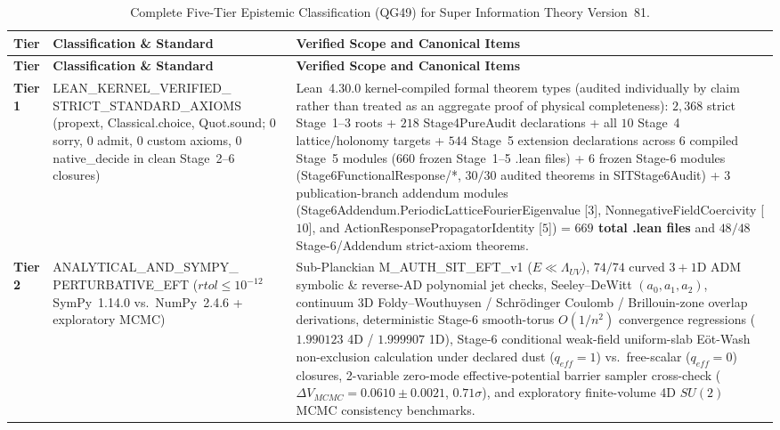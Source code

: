 \documentclass[american,11pt,letterpaper]{article}
\def\mathrm#1{#1}%
\def\texttt#1{#1}%
\begin{document}
\begin{longtable}{|p{2.3cm}|p{4.3cm}|p{8.4cm}|}
\caption{Complete Five-Tier Epistemic Classification (\texttt{QG49}) for Super Information Theory Version~81.}\label{tab:qg49-ledger}\\
\hline
\textbf{Tier} & \textbf{Classification \& Standard} & \textbf{Verified Scope and Canonical Items} \\
\hline
\endfirsthead
\hline
\textbf{Tier} & \textbf{Classification \& Standard} & \textbf{Verified Scope and Canonical Items} \\
\hline
\endhead
\hline
\endfoot
\textbf{Tier 1} & \texttt{LEAN\_\allowbreak{}KERNEL\_\allowbreak{}VERIFIED\_\allowbreak{}} \texttt{STRICT\_\allowbreak{}STANDARD\_\allowbreak{}AXIOMS} (\texttt{propext}, \texttt{Classical.choice}, \texttt{Quot.sound}; \texttt{0 sorry}, \texttt{0 admit}, \texttt{0} custom axioms, \texttt{0 native\_decide} in clean Stage~2--6 closures) & Lean~4.30.0 kernel-compiled formal theorem types (audited individually by claim rather than treated as an aggregate proof of physical completeness): $2{,}368$ strict Stage~1--3 roots + $218$ \texttt{Stage4PureAudit} declarations + all $10$ Stage~4 lattice/holonomy targets + $544$ Stage~5 extension declarations across $6$ compiled Stage~5 modules ($660$ frozen Stage~1--5 \texttt{.lean} files) + $6$ frozen Stage-6 modules (\texttt{Stage6FunctionalResponse/*}, $30/30$ audited theorems in \texttt{SITStage6Audit}) + $3$ publication-branch addendum modules (\texttt{Stage6Addendum.\allowbreak{}PeriodicLatticeFourierEigenvalue} [$3$], \texttt{NonnegativeFieldCoercivity} [$10$], and \texttt{ActionResponsePropagatorIdentity} [$5$]) = \textbf{$669$ total \texttt{.lean} files} and $48/48$ Stage-6/Addendum strict-axiom theorems. \\
\hline
\textbf{Tier 2} & \texttt{ANALYTICAL\_\allowbreak{}AND\_\allowbreak{}SYMPY\_\allowbreak{}} \texttt{PERTURBATIVE\_EFT} ($\mathrm{rtol} \le 10^{-12}$ SymPy~1.14.0 vs.\ NumPy~2.4.6 + exploratory MCMC) & Sub-Planckian \texttt{M\_AUTH\_SIT\_EFT\_v1} ($E \ll \Lambda_{\mathrm{UV}}$), $74/74$ curved $3+1$D ADM symbolic \& reverse-AD polynomial jet checks, Seeley--DeWitt $(a_0,a_1,a_2)$, continuum 3D Foldy--Wouthuysen / Schr\"odinger Coulomb / Brillouin-zone overlap derivations, deterministic Stage-6 smooth-torus $O(1/n^2)$ convergence regressions ($1.990123$ 4D / $1.999907$ 1D), Stage-6 conditional weak-field uniform-slab E\"ot-Wash non-exclusion calculation under declared dust ($q_{\mathrm{eff}}=1$) vs.\ free-scalar ($q_{\mathrm{eff}}=0$) closures, 2-variable zero-mode effective-potential barrier sampler cross-check ($\Delta V_{\mathrm{MCMC}} = 0.0610 \pm 0.0021$, $0.71\sigma$), and exploratory finite-volume 4D $SU(2)$ MCMC consistency benchmarks. \\

\end{longtable}
\end{document}
